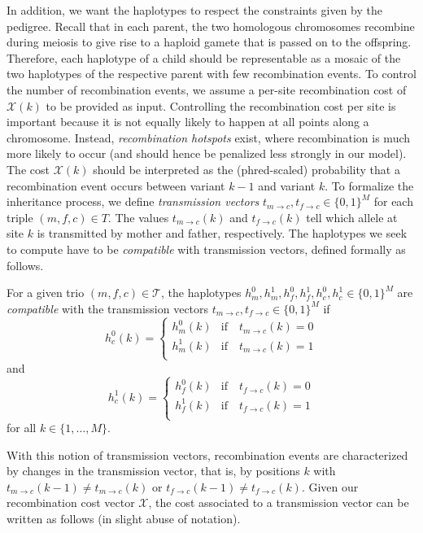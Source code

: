 In addition, we want the haplotypes to respect the constraints given by the pedigree.
Recall that in each parent, the two homologous chromosomes recombine during meiosis to give rise to a haploid gamete that is passed on to the offspring.
Therefore, each haplotype of a child should be representable as a mosaic of the two haplotypes of the respective parent with few recombination events.
To control the number of recombination events, we assume a per-site recombination cost of $\mathcal{X}(k)$ to be provided as input.
Controlling the recombination cost per site is important because it is not equally likely to happen at all points along a chromosome.
Instead, \emph{recombination hotspots} exist, where recombination is much more likely to occur (and should hence be penalized less strongly in our model).
The cost $\mathcal{X}(k)$ should be interpreted as the (phred-scaled) probability that a recombination event occurs between variant $k-1$ and variant $k$.
To formalize the inheritance process, we define \emph{transmission vectors} $t_{m\to c}, t_{f\to c}\in \{0,1\}^M$ for each triple $(m,f,c)\in T$.
The values $t_{m\to c}(k)$ and $t_{f\to c}(k)$ tell which allele at site $k$ is transmitted by mother and father, respectively.
The haplotypes we seek to compute have to be \emph{compatible} with transmission vectors, defined formally as follows.

\begin{definition}
For a given trio $(m,f,c)\in\mathcal{T}$, the haplotypes $h^0_m,h^1_m,h^0_f,h^1_f,h^0_c,h^1_c\in\{0,1\}^M$ are \emph{compatible} with the transmission vectors $t_{m\to c}, t_{f\to c}\in \{0,1\}^M$ if
\[h^0_c(k)=
 \begin{cases}
  h^0_m(k) & \text{if}\quad t_{m\to c}(k)=0 \\
  h^1_m(k) & \text{if}\quad t_{m\to c}(k)=1 \\
 \end{cases}
\]
and
\[h^1_c(k)=
 \begin{cases}
  h^0_f(k) & \text{if}\quad t_{f\to c}(k)=0 \\
  h^1_f(k) & \text{if}\quad t_{f\to c}(k)=1 \\
 \end{cases}
\]
for all $k\in\{1,\ldots,M\}$.
\end{definition}
With this notion of transmission vectors, recombination events are characterized by changes in the transmission vector, that is, by positions $k$ with $t_{m\to c}(k-1)\neq t_{m\to c}(k)$ or $t_{f\to c}(k-1)\neq t_{f\to c}(k)$.
Given our recombination cost vector $\mathcal{X}$, the cost associated to a transmission vector can be written as follows (in slight abuse of notation).

